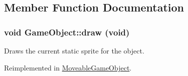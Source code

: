 \subsection{Member Function Documentation}
\hypertarget{classGameObject_abb64143e72358beb808db22182517802}{
\subsubsection[{draw}]{\setlength{\rightskip}{0pt plus 5cm}void GameObject::draw (void)}}
\label{classGameObject_abb64143e72358beb808db22182517802}
Draws the current static sprite for the object. 

Reimplemented in \hyperlink{classMoveableGameObject_a6110e3bcfb088cfaa53bc81ce220bab1}{MoveableGameObject}.

